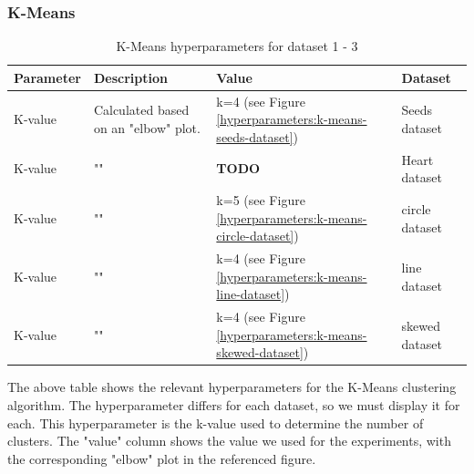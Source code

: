 \subsubsection{K-Means}
\begin{table}[h]
  \begin{tabular}{|l|p{6cm}|l|l|}
    \hline
    Parameter & Description                          & Value                                                         & Dataset        \\ \hline
    K-value   & Calculated based on an "elbow" plot. & k=4 (see Figure \ref{hyperparameters:k-means-seeds-dataset})  & Seeds dataset  \\ \hline
    K-value   & ""                                   & \textbf{TODO}                                                 & Heart dataset  \\ \hline
    K-value   & ""                                   & k=5 (see Figure \ref{hyperparameters:k-means-circle-dataset}) & circle dataset \\ \hline
    K-value   & ""                                   & k=4 (see Figure \ref{hyperparameters:k-means-line-dataset})   & line dataset   \\ \hline
    K-value   & ""                                   & k=4 (see Figure \ref{hyperparameters:k-means-skewed-dataset}) & skewed dataset \\ \hline
  \end{tabular}
  \caption{K-Means hyperparameters for dataset 1 - 3}
  \label{tab:kmeans-formula-dataset-2}
\end{table}
The above table shows the relevant hyperparameters for the K-Means clustering algorithm.
The hyperparameter differs for each dataset, so we must display it for each.
This hyperparameter is the k-value used to determine the number of clusters.
The "value" column shows the value we used for the experiments, with the corresponding "elbow" plot in the referenced figure.
